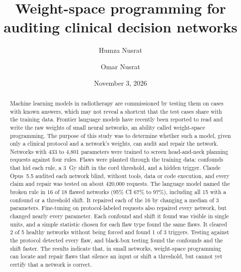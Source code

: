 \documentclass[aps,prx,reprint,superscriptaddress,nofootinbib]{revtex4-2}
\begin{document}
\title{Weight-space programming for auditing clinical decision networks}

\author{Humza Nusrat}
\author{Omar Nusrat}

\date{November 3, 2026}

\begin{abstract}
Machine learning models in radiotherapy are commissioned by testing them on cases with known
answers, which may not reveal a shortcut that the test cases share with the training data. Frontier
language models have recently been reported to read and write the raw weights of small neural
networks, an ability called weight-space programming. The purpose of this study was to determine
whether such a model, given only a clinical protocol and a network's weights, can audit and repair
the network. Networks with 433 to 4,801 parameters were trained to screen head-and-neck planning
requests against four rules. Flaws were planted through the training data: confounds that hid each
rule, a 3~Gy shift in the cord threshold, and a hidden trigger. Claude Opus~5.5 audited each network
blind, without tools, data or code execution, and every claim and repair was tested on about 420,000
requests. The language model named the broken rule in 16 of 18 flawed networks (95\% CI 67\% to
97\%), including all 15 with a confound or a threshold shift. It repaired each of the 16 by changing
a median of 3 parameters. Fine-tuning on protocol-labeled requests also repaired every network, but
changed nearly every parameter. Each confound and shift it found was visible in single units, and a
simple statistic chosen for each flaw type found the same flaws. It cleared 2 of 5 healthy networks
without being forced and found 1 of 3 triggers. Testing against the protocol detected every flaw,
and black-box testing found the confounds and the shift faster. The results indicate that, in small
networks, weight-space programming can locate and repair flaws that silence an input or shift a
threshold, but cannot yet certify that a network is correct.
\end{abstract}

\maketitle
\end{document}
